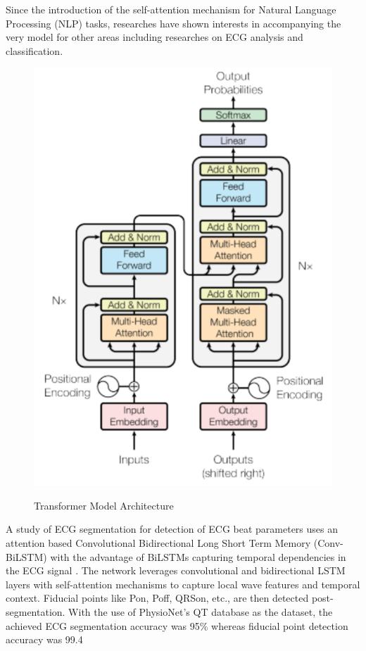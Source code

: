 \documentclass[conference]{IEEEtran}
\begin{document}
Since the introduction of the self-attention mechanism for Natural Language Processing (NLP) tasks, researches have shown interests in accompanying the very model for other areas including researches on ECG analysis and classification.


\begin{figure}[htbp]
\centering
{\includegraphics[scale=0.3]{fig2.png}}
\caption{Transformer Model Architecture \cite{b14}}
\label{fig}
\end{figure}

A study of ECG segmentation for detection of ECG beat parameters\cite{b15} uses an attention based Convolutional Bidirectional Long Short Term Memory (Conv-BiLSTM) with the advantage of BiLSTMs capturing temporal dependencies in the ECG signal \cite{b17}. The network leverages convolutional and bidirectional LSTM layers with self-attention mechanisms to capture local wave features and temporal context. Fiducial points like Pon, Poff, QRSon, etc., are then detected post-segmentation. With the use of PhysioNet’s QT database as the dataset, the achieved ECG segmentation accuracy was 95\% whereas fiducial point detection accuracy was 99.4%
	
\end{document}
